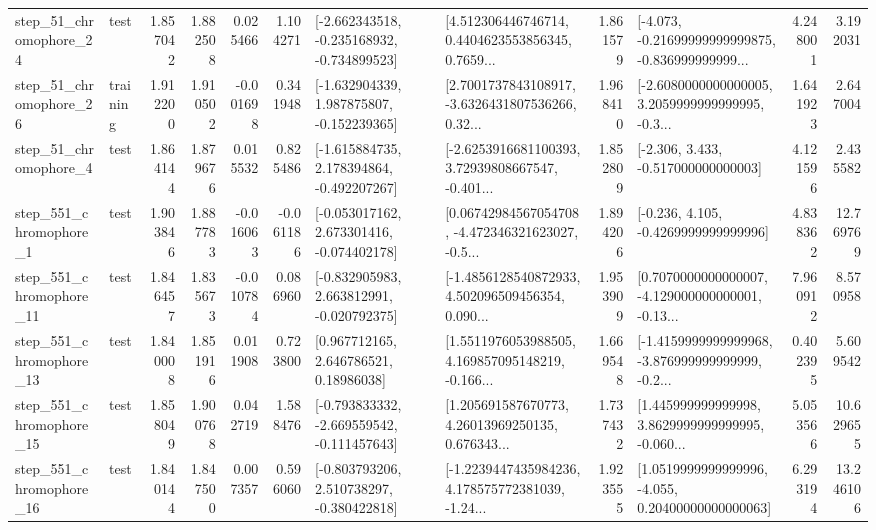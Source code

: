 \begin{tabular}{llrrrrllrlrr}
   step\_51\_chromophore\_24 &      test &      1.857042 &    1.882508 &      0.025466 &  1.104271 &  [-2.662343518, -0.235168932, -0.734899523] &  [4.512306446746714, 0.4404623553856345, 0.7659... &       1.861579 &  [-4.073, -0.21699999999999875, -0.836999999999... &            4.248001 &          3.192031 \\
   step\_51\_chromophore\_26 &  training &      1.912200 &    1.910502 &     -0.001698 &  0.341948 &   [-1.632904339, 1.987875807, -0.152239365] &  [2.7001737843108917, -3.6326431807536266, 0.32... &       1.968410 &  [-2.6080000000000005, 3.2059999999999995, -0.3... &            1.641923 &          2.647004 \\
    step\_51\_chromophore\_4 &      test &      1.864144 &    1.879676 &      0.015532 &  0.825486 &   [-1.615884735, 2.178394864, -0.492207267] &  [-2.6253916681100393, 3.72939808667547, -0.401... &       1.852809 &                [-2.306, 3.433, -0.517000000000003] &            4.121596 &          2.435582 \\
   step\_551\_chromophore\_1 &      test &      1.903846 &    1.887783 &     -0.016063 & -0.061186 &   [-0.053017162, 2.673301416, -0.074402178] &  [0.06742984567054708, -4.472346321623027, -0.5... &       1.894206 &               [-0.236, 4.105, -0.4269999999999996] &            4.838362 &         12.769769 \\
  step\_551\_chromophore\_11 &      test &      1.846457 &    1.835673 &     -0.010784 &  0.086960 &   [-0.832905983, 2.663812991, -0.020792375] &  [-1.4856128540872933, 4.502096509456354, 0.090... &       1.953909 &  [0.7070000000000007, -4.129000000000001, -0.13... &            7.960912 &          8.570958 \\
  step\_551\_chromophore\_13 &      test &      1.840008 &    1.851916 &      0.011908 &  0.723800 &      [0.967712165, 2.646786521, 0.18986038] &  [1.5511976053988505, 4.169857095148219, -0.166... &       1.669548 &  [-1.4159999999999968, -3.876999999999999, -0.2... &            0.402395 &          5.609542 \\
  step\_551\_chromophore\_15 &      test &      1.858049 &    1.900768 &      0.042719 &  1.588476 &  [-0.793833332, -2.669559542, -0.111457643] &  [1.205691587670773, 4.26013969250135, 0.676343... &       1.737432 &  [1.445999999999998, 3.8629999999999995, -0.060... &            5.053566 &         10.629655 \\
  step\_551\_chromophore\_16 &      test &      1.840144 &    1.847500 &      0.007357 &  0.596060 &   [-0.803793206, 2.510738297, -0.380422818] &  [-1.2239447435984236, 4.178575772381039, -1.24... &       1.923555 &  [1.0519999999999996, -4.055, 0.20400000000000063] &            6.293194 &         13.246106 \\

\end{tabular}
